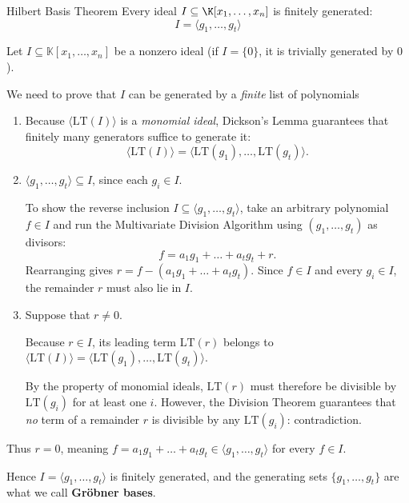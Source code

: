 \documentclass[a4paper, 11pt]{report}
\newcommand{\gen}[1]{\langle #1 \rangle}
\begin{document}
\begin{thmframe}{Hilbert Basis Theorem}{}
    Every ideal $I \subseteq \K[x_1, \dots , x_{n}]$ is finitely generated: 
    $$ I = \gen{g_1, \dots , g_{t}} $$
\end{thmframe}

Let $I \subseteq \mathbb{K}[x_1, \dots, x_n]$ be a nonzero ideal (if $I = \{0\}$, it is trivially generated by $0$). 

We need to prove that $I$ can be generated by a \emph{finite} list of polynomials

\begin{enumerate}
    \item Because $\langle \mathrm{LT}(I) \rangle$ is a \emph{monomial ideal}, Dickson's Lemma guarantees that finitely many generators suffice to generate it:
    $$
    \langle \mathrm{LT}(I) \rangle = \langle \mathrm{LT}(g_1), \dots, \mathrm{LT}(g_t) \rangle.
    $$

    \item $\langle g_1, \dots, g_t \rangle \subseteq I$, since each $g_i \in I$.

        To show the reverse inclusion $I \subseteq \langle g_1, \dots, g_t \rangle$, take an arbitrary polynomial $f \in I$ and run the Multivariate Division Algorithm using $(g_1, \dots, g_t)$ as divisors:
    $$
    f = a_1 g_1 + \dots + a_t g_t + r.
    $$
    Rearranging gives $r = f - (a_1 g_1 + \dots + a_t g_t)$. Since $f \in I$ and every $g_i \in I$, the remainder $r$ must also lie in $I$.

    \item Suppose that $r \neq 0$.

        Because $r \in I$, its leading term $\mathrm{LT}(r)$ belongs to $\langle \mathrm{LT}(I) \rangle = \langle \mathrm{LT}(g_1), \dots, \mathrm{LT}(g_t) \rangle$. 

        By the property of monomial ideals, $\mathrm{LT}(r)$ must therefore be divisible by $\mathrm{LT}(g_i)$ for at least one $i$. However, the Division Theorem guarantees that \emph{no} term of a remainder $r$ is divisible by any $\mathrm{LT}(g_i)$: contradiction.
\end{enumerate}

\noindent Thus $r = 0$, meaning $f = a_1 g_1 + \dots + a_t g_t \in \langle g_1, \dots, g_t \rangle$ for every $f \in I$. 

Hence $I = \langle g_1, \dots, g_t \rangle$ is finitely generated, and the generating sets $\{g_1, \dots, g_t\}$ are what we call \textbf{Gr\"obner bases}.
\end{document}

